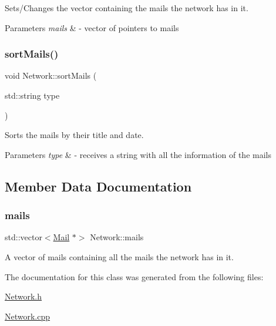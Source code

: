 Sets/\+Changes the vector containing the mails the network has in it. 


\begin{DoxyParams}{Parameters}
{\em mails} & -\/ vector of pointers to mails \\
\hline
\end{DoxyParams}
\mbox{\label{classNetwork_ab7eb46f37b172f7e7281ad5d27cb0ba0}} 
\subsubsection{\texorpdfstring{sort\+Mails()}{sortMails()}}
{\footnotesize\ttfamily void Network\+::sort\+Mails (\begin{DoxyParamCaption}\item[{std\+::string}]{type }\end{DoxyParamCaption})}



Sorts the mails by their title and date. 


\begin{DoxyParams}{Parameters}
{\em type} & -\/ receives a string with all the information of the mails \\
\hline
\end{DoxyParams}


\subsection{Member Data Documentation}
\mbox{\label{classNetwork_a7d870918668129e7853c5374785955b1}} 
\subsubsection{\texorpdfstring{mails}{mails}}
{\footnotesize\ttfamily std\+::vector$<$\hyperlink{classMail}{Mail} $\ast$$>$ Network\+::mails\hspace{0.3cm}{\ttfamily [private]}}



A vector of mails containing all the mails the network has in it. 



The documentation for this class was generated from the following files\+:\begin{DoxyCompactItemize}
\item 
\hyperlink{Network_8h}{Network.\+h}\item 
\hyperlink{Network_8cpp}{Network.\+cpp}\end{DoxyCompactItemize}
